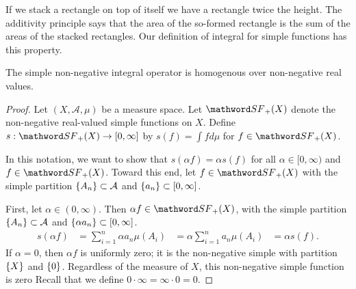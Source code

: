 

If we stack a rectangle on top of itself we have a rectangle twice the height.
The additivity principle says that the area of the so-formed rectangle is the sum of the areas of the stacked rectangles.
Our definition of integral for simple functions has this property.


\begin{prop}

The simple non-negative integral operator is homogenous over non-negative real values.

\begin{proof}

Let $(X, \mathcal{A}, \mu)$ be a measure space.
Let $\SimpleF_+(X)$ denote the non-negative real-valued simple functions on $X$.
Define $s: \SimpleF_+(X) \to [0, \infty]$ by $s(f) = \int f d\mu$ for $f \in \SimpleF_+(X)$.

In this notation, we want to show that $s(\alpha f) = \alpha s(f)$ for all $\alpha \in [0, \infty)$ and $f \in \SimpleF_+(X)$.
Toward this end, let $f \in \SimpleF_+(X)$ with the simple partition $\{A_n\} \subset \mathcal{A}$ and $\{a_n\} \subset [0, \infty]$.

%

First, let
$\alpha \in (0, \infty)$.
Then $\alpha f \in \SimpleF_+(X)$,
with the simple partition
$\{A_n\} \subset \mathcal{A}$
and $\{\alpha a_n\} \subset [0, \infty]$.
\[
  \begin{aligned}
  s(\alpha f) &= \sum_{i = 1}^{n} \alpha a_n \mu(A_i)
              &= \alpha \sum_{i = 1}^{n} a_n \mu(A_i)
              &= \alpha s(f).
  \end{aligned}
\]
If $\alpha = 0$, then $\alpha f$ is uniformly
zero; it is the non-negative simple
with partition $\{X\}$ and $\{0\}$.
Regardless of the measure of $X$,
this non-negative simple function is zero
Recall that we define
$0 \cdot \infty = \infty \cdot 0 = 0$.
\end{proof}

\end{prop}

\blankpage
